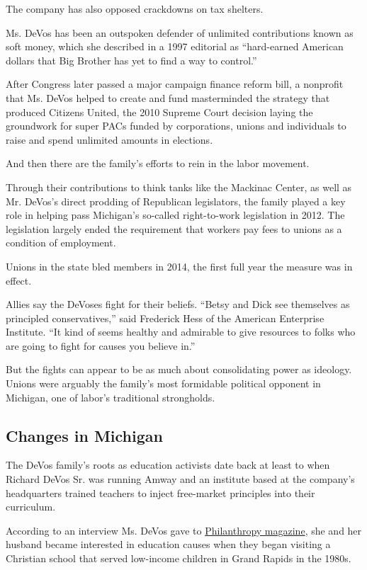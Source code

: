 The company has also opposed crackdowns on tax shelters.

Ms. DeVos has been an outspoken defender of unlimited contributions
known as soft money, which she described in a 1997 editorial as
``hard-earned American dollars that Big Brother has yet to find a way to
control.''

After Congress later passed a major campaign finance reform bill, a
nonprofit that Ms. DeVos helped to create and fund masterminded the
strategy that produced Citizens United, the 2010 Supreme Court decision
laying the groundwork for super PACs funded by corporations, unions and
individuals to raise and spend unlimited amounts in elections.

And then there are the family's efforts to rein in the labor movement.

Through their contributions to think tanks like the Mackinac Center, as
well as Mr. DeVos's direct prodding of Republican legislators, the
family played a key role in helping pass Michigan's so-called
right-to-work legislation in 2012. The legislation largely ended the
requirement that workers pay fees to unions as a condition of
employment.

Unions in the state bled members in 2014, the first full year the
measure was in effect.

Allies say the DeVoses fight for their beliefs. ``Betsy and Dick see
themselves as principled conservatives,'' said Frederick Hess of the
American Enterprise Institute. ``It kind of seems healthy and admirable
to give resources to folks who are going to fight for causes you believe
in.''

But the fights can appear to be as much about consolidating power as
ideology. Unions were arguably the family's most formidable political
opponent in Michigan, one of labor's traditional strongholds.

\hypertarget{changes-in-michigan}{%
\subsection{Changes in Michigan}\label{changes-in-michigan}}

The DeVos family's roots as education activists date back at least to
when Richard DeVos Sr. was running Amway and an institute based at the
company's headquarters trained teachers to inject free-market principles
into their curriculum.

According to an interview Ms. DeVos gave to
\href{http://www.philanthropyroundtable.org/topic/excellence_in_philanthropy/interview_with_betsy_devos}{Philanthropy
magazine}, she and her husband became interested in education causes
when they began visiting a Christian school that served low-income
children in Grand Rapids in the 1980s.


